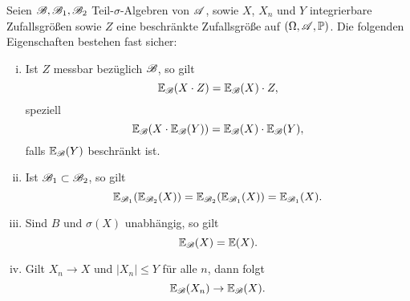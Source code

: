 \begin{thm}
  Seien $\mathscr{B}, \mathscr{B}_1, \mathscr{B}_2$ Teil-$\sigma$-Algebren von $\mathscr{A}$, sowie $X$, $X_n$
  und $Y$ integrierbare Zufallsgrößen sowie $Z$ eine beschränkte Zufallsgröße
  auf $(\Omega, \mathscr{A}, \mathbb{P})$. Die folgenden Eigenschaften bestehen fast sicher:
  \begin{enumerate}[(i)]
  \item Ist $Z$ messbar bezüglich $\mathscr{B}$, so gilt
    \[ \mathbb{E}_{\mathscr{B}}( X \cdot Z ) = \mathbb{E}_{\mathscr{B}}(X) \cdot Z, \]
    speziell
    \[ \mathbb{E}_{\mathscr{B}}( X \cdot \mathbb{E}_{\mathscr{B}}(Y)) = \mathbb{E}_{\mathscr{B}}(X) \cdot \mathbb{E}_{\mathscr{B}}(Y), \]
    falls $\mathbb{E}_{\mathscr{B}}(Y)$ beschränkt ist.
  \item Ist $\mathscr{B}_1 \subset \mathscr{B}_2$, so gilt
    \[ \mathbb{E}_{\mathscr{B}_1}( \mathbb{E}_{\mathscr{B}_2} (X) ) = \mathbb{E}_{\mathscr{B}_2}( \mathbb{E}_{\mathscr{B}_1}(X) ) =
      \mathbb{E}_{\mathscr{B}_1}(X). \]
  \item Sind $B$ und $\sigma(X)$ unabhängig, so gilt
    \[ \mathbb{E}_{\mathscr{B}}(X) = \mathbb{E}(X). \]
  \item Gilt $X_n \to X$ und $|X_n| \le Y$ für alle $n$, dann folgt
    \[ \mathbb{E}_{\mathscr{B}}(X_n) \to \mathbb{E}_{\mathscr{B}}(X). \]
  \end{enumerate}
\end{thm}

